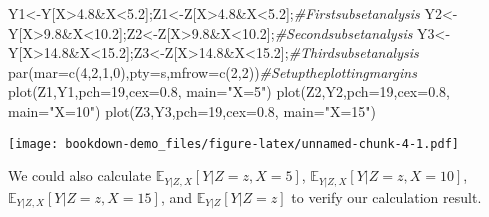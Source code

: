 \documentclass[
]{book}
\newenvironment{Shaded}{\begin{snugshade}}{\end{snugshade}}
\newcommand{\AttributeTok}[1]{\textcolor[rgb]{0.77,0.63,0.00}{#1}}
\newcommand{\CommentTok}[1]{\textcolor[rgb]{0.56,0.35,0.01}{\textit{#1}}}
\newcommand{\DecValTok}[1]{\textcolor[rgb]{0.00,0.00,0.81}{#1}}
\newcommand{\FloatTok}[1]{\textcolor[rgb]{0.00,0.00,0.81}{#1}}
\newcommand{\FunctionTok}[1]{\textcolor[rgb]{0.00,0.00,0.00}{#1}}
\newcommand{\NormalTok}[1]{#1}
\newcommand{\OtherTok}[1]{\textcolor[rgb]{0.56,0.35,0.01}{#1}}
\newcommand{\SpecialCharTok}[1]{\textcolor[rgb]{0.00,0.00,0.00}{#1}}
\newcommand{\StringTok}[1]{\textcolor[rgb]{0.31,0.60,0.02}{#1}}
\begin{document}
\begin{Shaded}
\begin{Highlighting}[]
\NormalTok{Y1}\OtherTok{\textless{}{-}}\NormalTok{Y[X}\SpecialCharTok{\textgreater{}}\FloatTok{4.8}\SpecialCharTok{\&}\NormalTok{X}\SpecialCharTok{\textless{}}\FloatTok{5.2}\NormalTok{];Z1}\OtherTok{\textless{}{-}}\NormalTok{Z[X}\SpecialCharTok{\textgreater{}}\FloatTok{4.8}\SpecialCharTok{\&}\NormalTok{X}\SpecialCharTok{\textless{}}\FloatTok{5.2}\NormalTok{];}\CommentTok{\#Firstsubsetanalysis }
\NormalTok{Y2}\OtherTok{\textless{}{-}}\NormalTok{Y[X}\SpecialCharTok{\textgreater{}}\FloatTok{9.8}\SpecialCharTok{\&}\NormalTok{X}\SpecialCharTok{\textless{}}\FloatTok{10.2}\NormalTok{];Z2}\OtherTok{\textless{}{-}}\NormalTok{Z[X}\SpecialCharTok{\textgreater{}}\FloatTok{9.8}\SpecialCharTok{\&}\NormalTok{X}\SpecialCharTok{\textless{}}\FloatTok{10.2}\NormalTok{];}\CommentTok{\#Secondsubsetanalysis }
\NormalTok{Y3}\OtherTok{\textless{}{-}}\NormalTok{Y[X}\SpecialCharTok{\textgreater{}}\FloatTok{14.8}\SpecialCharTok{\&}\NormalTok{X}\SpecialCharTok{\textless{}}\FloatTok{15.2}\NormalTok{];Z3}\OtherTok{\textless{}{-}}\NormalTok{Z[X}\SpecialCharTok{\textgreater{}}\FloatTok{14.8}\SpecialCharTok{\&}\NormalTok{X}\SpecialCharTok{\textless{}}\FloatTok{15.2}\NormalTok{];}\CommentTok{\#Thirdsubsetanalysis }
\FunctionTok{par}\NormalTok{(}\AttributeTok{mar=}\FunctionTok{c}\NormalTok{(}\DecValTok{4}\NormalTok{,}\DecValTok{2}\NormalTok{,}\DecValTok{1}\NormalTok{,}\DecValTok{0}\NormalTok{),}\AttributeTok{pty=}\StringTok{\textquotesingle{}s\textquotesingle{}}\NormalTok{,}\AttributeTok{mfrow=}\FunctionTok{c}\NormalTok{(}\DecValTok{2}\NormalTok{,}\DecValTok{2}\NormalTok{))}\CommentTok{\#Setuptheplottingmargins }
\FunctionTok{plot}\NormalTok{(Z1,Y1,}\AttributeTok{pch=}\DecValTok{19}\NormalTok{,}\AttributeTok{cex=}\FloatTok{0.8}\NormalTok{, }\AttributeTok{main=}\StringTok{"X=5"}\NormalTok{)}
\FunctionTok{plot}\NormalTok{(Z2,Y2,}\AttributeTok{pch=}\DecValTok{19}\NormalTok{,}\AttributeTok{cex=}\FloatTok{0.8}\NormalTok{, }\AttributeTok{main=}\StringTok{"X=10"}\NormalTok{)}
\FunctionTok{plot}\NormalTok{(Z3,Y3,}\AttributeTok{pch=}\DecValTok{19}\NormalTok{,}\AttributeTok{cex=}\FloatTok{0.8}\NormalTok{, }\AttributeTok{main=}\StringTok{"X=15"}\NormalTok{)}
\end{Highlighting}
\end{Shaded}

\texttt{[image: bookdown-demo\_files/figure-latex/unnamed-chunk-4-1.pdf]}

We could also calculate \(\mathbb{E}_{Y|Z,X}[Y|Z=z, X=5]\), \(\mathbb{E}_{Y|Z,X}[Y|Z=z, X=10]\), \(\mathbb{E}_{Y|Z,X}[Y|Z=z, X=15]\), and \(\mathbb{E}_{Y|Z}[Y|Z=z]\) to verify our calculation result.
\end{document}
